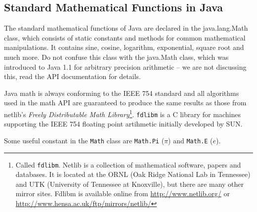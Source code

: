 \subsection{Standard Mathematical Functions in Java}
\label{sec:Standard_Math}

The standard mathematical functions of Java are declared in the 
java.lang.Math class, which consists of static constants and methods
for common mathematical manipulations. 
It contains sine, cosine, logarithm, exponential,
square root and much more. Do not confuse this class with the
java.Math class, which was introduced to Java 1.1 for arbitrary
precision arithmetic -- we are not discussing this, read the
API documentation for details.

Java math is always conforming to the IEEE 754 standard and all
algorithms used in the math API are guaranteed to produce the
same results as those from netlib's 
\emph{Freely Distributable Math Library}\footnote{Called \texttt{fdlibm}.
Netlib is a collection of mathematical software, papers and databases.
It is located at the ORNL (Oak Ridge National Lab in Tennessee) and UTK (University
of Tennessee at Knoxville), but there are many other mirror sites.
Fdlibm is available online from 
\href{http://www.netlib.org/}{http://www.netlib.org/} or
\href{http://www.hensa.ac.uk/ftp/mirrors/netlib/}%
           {http://www.hensa.ac.uk/ftp/mirrors/netlib/}}.
\verb|fdlibm| is a C library for machines supporting the IEEE 754 floating
point artihmetic initially developed by SUN.

Some useful constant in the \verb|Math| class  are \verb|Math.Pi|
($\pi$) and \verb|Math.E| ($e$).




